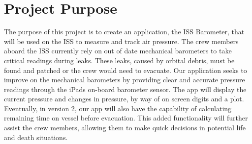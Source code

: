 \documentclass[onecolumn, draftclsnofoot,10pt, compsoc]{IEEEtran}
\def \CapstoneProjectName{ISS Barometer App }
\begin{document}
\begin{titlepage}
\begin{singlespace}
\begin{abstract}
        One very important aspect for the success of life in near vacuum is sustained air pressure inside the modules.
        This air pressure is monitored by mechanical barometers, called Manovacometers, which must be visually monitored, and are no longer available.
        The \CapstoneProjectName seeks to provide a suitable replacement for the current barometer device aboard the International Space Station.
        This document will serve to introduce the \CapstoneProjectName, and will detail the problem, the solution, and the success metrics of the project.
        The sections include the Definition of the Problem, Definition of Project, and the Metrics of Success.
        \end{abstract}
    \end{singlespace}
\end{titlepage}
\newpage
{}
\tableofcontents
\clearpage

\section{Project Purpose}
The purpose of this project is to create an application, the ISS Barometer, that will be used on the ISS to measure and track air pressure.
The crew members aboard the ISS currently rely on out of date mechanical barometers to take critical readings during leaks.
These leaks, caused by orbital debris, must be found and patched or the crew would need to evacuate.
Our application seeks to improve on the mechanical barometers by providing clear and accurate pressure readings through the iPads on-board barometer sensor.
The app will display the current pressure and changes in pressure, by way of on screen digits and a plot.
Eventually, in version 2, our app will also have the capability of calculating remaining time on vessel before evacuation.
This added functionality will further assist the crew members, allowing them to make quick decisions in potential life and death situations.
\end{document}
